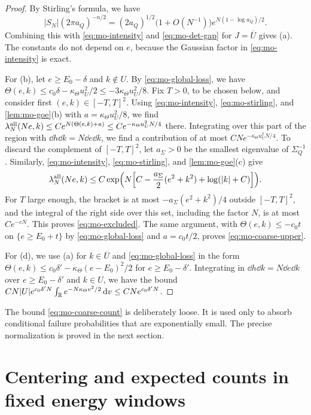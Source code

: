 \begin{proof}
By Stirling's formula, we have
\begin{equation}\label{eq:mo-stirling}
|S_N|(2\pi a_Q)^{-n/2}=(2a_Q)^{1/2}\bigl(1+O(N^{-1})\bigr)e^{N(1-\log a_Q)/2}.
\end{equation}
Combining this with \eqref{eq:mo-intensity} and \eqref{eq:mo-det-gap} for $J=\overline U$ gives (a). The constants do not depend on $e$, because the Gaussian factor in \eqref{eq:mo-intensity} is exact.

For (b), let $e\ge E_0-\delta$ and $k\notin U$. By \eqref{eq:mo-global-loss}, we have $\Theta(e,k)\le c_0\delta-\kappa_\Theta u_U^2/2\le-3\kappa_\Theta u_U^2/8$. Fix $T>0$, to be chosen below, and consider first $(e,k)\in[-T,T]^2$. Using \eqref{eq:mo-intensity}, \eqref{eq:mo-stirling}, and \cref{lem:mo-goe}(b) with $a=\kappa_\Theta u_U^2/8$, we find $\lambda_N^{\rm all}(Ne,k)\le Ce^{N(\Theta(e,k)+a)}\le Ce^{-\kappa_\Theta u_U^2N/4}$ there. Integrating over this part of the region with $\dd h\dd k=N\dd e\dd k$, we find a contribution of at most $CNe^{-\kappa_\Theta u_U^2N/4}$. To discard the complement of $[-T,T]^2$, let $a_\Sigma>0$ be the smallest eigenvalue of $\Sigma_Q^{-1}$. Similarly, \eqref{eq:mo-intensity}, \eqref{eq:mo-stirling}, and \cref{lem:mo-goe}(c) give
\[
\lambda_N^{\rm all}(Ne,k)\le C\exp\Bigl(N\Bigl[C-\frac{a_\Sigma}2(e^2+k^2)+\log(|k|+C)\Bigr]\Bigr).
\]
For $T$ large enough, the bracket is at most $-a_\Sigma(e^2+k^2)/4$ outside $[-T,T]^2$, and the integral of the right side over this set, including the factor $N$, is at most $Ce^{-cN}$. This proves \eqref{eq:mo-excluded}. The same argument, with $\Theta(e,k)\le-c_0t$ on $\{e\ge E_0+t\}$ by \eqref{eq:mo-global-loss} and $a=c_0t/2$, proves \eqref{eq:mo-coarse-upper}.

For (d), we use (a) for $k\in\overline U$ and \eqref{eq:mo-global-loss} in the form $\Theta(e,k)\le c_0\delta'-\kappa_\Theta(e-E_0)^2/2$ for $e\ge E_0-\delta'$. Integrating in $\dd h\dd k=N\dd e\dd k$ over $e\ge E_0-\delta'$ and $k\in U$, we have the bound $CN|U|e^{c_0\delta'N}\int_\mathbb R e^{-N\kappa_\Theta v^2/2}\,\mathrm d v\le CNe^{c_0\delta'N}$.
\end{proof}

The bound \eqref{eq:mo-coarse-count} is deliberately loose. It is used only to absorb conditional failure probabilities that are exponentially small. The precise normalization is proved in the next section.


\section{Centering and expected counts in fixed energy windows}\label{sec:mo-micro}

